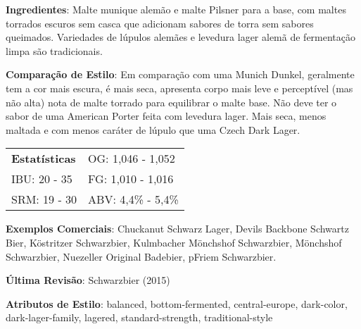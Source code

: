 \textbf{Ingredientes}: Malte munique alemão e malte Pilsner para a base, com maltes torrados escuros sem casca que adicionam sabores de torra sem sabores queimados. Variedades de lúpulos alemães e levedura lager alemã de fermentação limpa são tradicionais.

\textbf{Comparação de Estilo}: Em comparação com uma Munich Dunkel, geralmente tem a cor mais escura, é mais seca, apresenta corpo mais leve e perceptível (mas não alta) nota de malte torrado para equilibrar o malte base. Não deve ter o sabor de uma American Porter feita com levedura lager. Mais seca, menos maltada e com menos caráter de lúpulo que uma Czech Dark Lager.

\begin{tabular}{@{}p{35mm}p{35mm}@{}}
  \textbf{Estatísticas} & OG: 1,046 - 1,052 \\
  IBU: 20 - 35 & FG: 1,010 - 1,016 \\
  SRM: 19 - 30 & ABV: 4,4\% - 5,4\%
\end{tabular}

\textbf{Exemplos Comerciais}: Chuckanut Schwarz Lager, Devils Backbone Schwartz Bier, Köstritzer Schwarzbier, Kulmbacher Mönchshof Schwarzbier, Mönchshof Schwarzbier, Nuezeller Original Badebier, pFriem Schwarzbier.

\textbf{Última Revisão}: Schwarzbier (2015)

\textbf{Atributos de Estilo}: balanced, bottom-fermented, central-europe, dark-color, dark-lager-family, lagered, standard-strength, traditional-style
